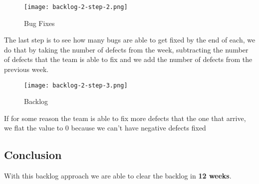 \begin{figure}[!htb]
    \centering
    \texttt{[image: backlog-2-step-2.png]}    
    \caption{Bug Fixes}
\end{figure}

\noindent
The last step is to see how many bugs are able to get fixed by the end of each,
we do that by taking the number of defects from the week, subtracting the 
number of defects that the team is able to fix and we add the number of defects 
from the previous week. \newline

\begin{figure}[!htb]
    \centering
    \texttt{[image: backlog-2-step-3.png]}    
    \caption{Backlog}
\end{figure}

\noindent
If for some reason the team is able to fix more defects that the one that 
arrive, we flat the value to 0 because we can't have negative defects fixed

\subsection{Conclusion}
With this backlog approach we are able to clear the backlog in \textbf{12 weeks}.
